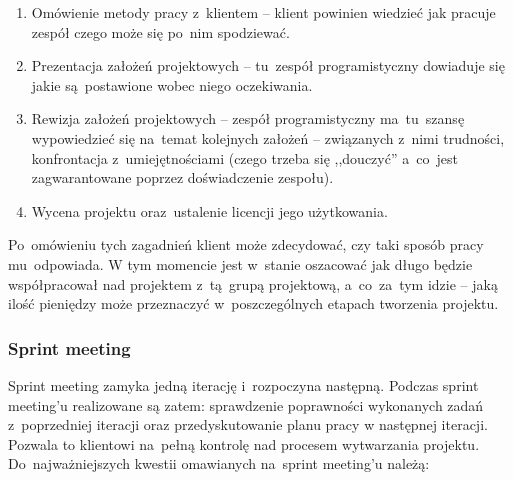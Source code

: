 \begin{enumerate}
  \item Omówienie metody pracy z~klientem -- klient powinien wiedzieć jak pracuje zespół  czego może się po~nim spodziewać.
  \item Prezentacja założeń projektowych -- tu~zespół programistyczny dowiaduje się jakie są~postawione wobec niego oczekiwania.
  \item Rewizja założeń projektowych -- zespół programistyczny ma~tu~szansę wypowiedzieć się na~temat kolejnych założeń -- związanych z~nimi trudności, konfrontacja z~umiejętnościami (czego trzeba się ,,douczyć'' a~co~jest zagwarantowane poprzez doświadczenie zespołu).
  \item Wycena projektu oraz~ustalenie licencji jego użytkowania.
\end{enumerate}

Po~omówieniu tych zagadnień klient może zdecydować, czy taki sposób pracy mu~odpowiada. W tym momencie jest w~stanie oszacować jak długo będzie współpracował nad projektem z~tą~grupą projektową, a~co~za~tym idzie -- jaką ilość pieniędzy może przeznaczyć w~poszczególnych etapach tworzenia projektu.

\subsubsection{Sprint meeting} \label{scrum.sprintmeeting}

Sprint meeting zamyka jedną iterację i~rozpoczyna następną. Podczas sprint meeting'u realizowane są zatem: sprawdzenie poprawności wykonanych zadań z~poprzedniej iteracji oraz przedyskutowanie planu pracy w następnej iteracji. Pozwala to klientowi na~pełną kontrolę nad procesem wytwarzania projektu. Do~najważniejszych kwestii omawianych na~sprint meeting'u należą:

